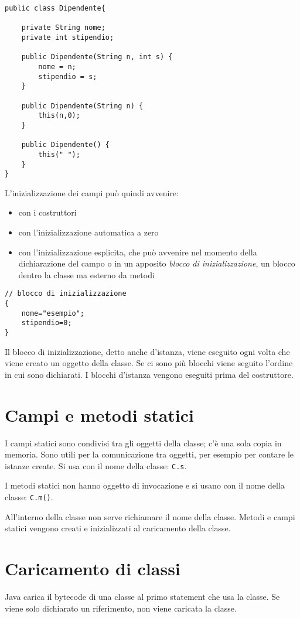 \begin{lstlisting}
public class Dipendente{
    
    private String nome;
    private int stipendio;
    
    public Dipendente(String n, int s) {
        nome = n;
        stipendio = s;
    }

    public Dipendente(String n) {
        this(n,0);
    }

    public Dipendente() {
        this(" ");
    }    
}
\end{lstlisting}
L'inizializzazione dei campi può quindi avvenire:
\begin{itemize}
\item con i costruttori
\item con l'inizializzazione automatica a zero
\item con l'inizializzazione esplicita, che può avvenire nel momento della dichiarazione del campo o in un apposito \textit{blocco di inizializzazione}, un blocco dentro la classe ma esterno da metodi
\end{itemize}

\begin{lstlisting}
// blocco di inizializzazione
{ 
    nome="esempio";
    stipendio=0;
}
\end{lstlisting}
Il blocco di inizializzazione, detto anche d'istanza, viene eseguito ogni volta che viene creato un oggetto della classe. Se ci sono più blocchi viene seguito l'ordine in cui sono dichiarati. I blocchi d'istanza vengono eseguiti prima del costruttore.

\section{Campi e metodi statici}
I campi statici sono condivisi tra gli oggetti della classe; c'è una sola copia in memoria. Sono utili per la comunicazione tra oggetti, per esempio per contare le istanze create. Si usa con il nome della classe: \texttt{C.s}.

I metodi statici non hanno oggetto di invocazione e si usano con il nome della classe: \texttt{C.m()}.

All'interno della classe non serve richiamare il nome della classe.
Metodi e campi statici vengono creati e inizializzati al caricamento della classe.

\section{Caricamento di classi}
Java carica il bytecode di una classe al primo statement che usa la classe. Se viene solo dichiarato un riferimento, non viene caricata la classe.


